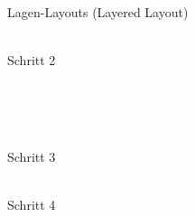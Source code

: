 \begin{TOP}{Lagen-Layouts (Layered Layout)}
{\begin{minipage}{0.24\textwidth}
	\end{minipage}
	\begin{minipage}{0.48\textwidth}
		\\
		\centering Schritt 2
	\end{minipage}\\
	\vspace*{\baselineskip}\\
	\phantom{1}\hfill\begin{minipage}{0.24\textwidth}
		\\
		\centering Schritt 3
	\end{minipage}
	\hspace*{0.5cm}
	\begin{minipage}{0.24\textwidth}
		\\
		\centering Schritt 4
	\end{minipage}\hfill\phantom{1}
}
\topbreak
{}
\end{TOP}